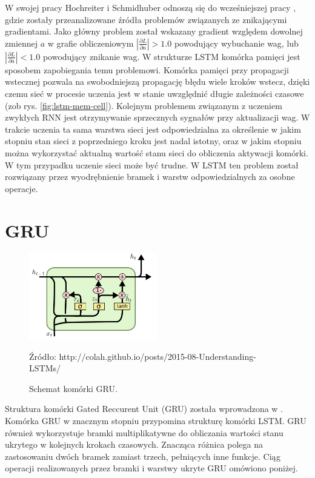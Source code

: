 \documentclass[oneside, mag]{mgr}
\begin{document}
W swojej pracy \cite{LSTM} Hochreiter i Schmidhuber odnoszą się do wcześniejszej pracy \cite{vanishing_gradient_RNN}, gdzie zostały przeanalizowane źródła problemów związanych ze znikającymi gradientami. Jako główny problem został wskazany gradient względem dowolnej zmiennej $a$ w grafie obliczeniowym $|\frac{\partial L}{\partial a}| > 1.0$ powodujący wybuchanie wag, lub $|\frac{\partial L}{\partial a}| < 1.0$ powodujący znikanie wag. W strukturze LSTM komórka pamięci jest sposobem zapobiegania temu problemowi. Komórka pamięci przy propagacji wstecznej pozwala na swobodniejszą propagację błędu wiele kroków wstecz, dzięki czemu sieć w procesie uczenia jest w stanie uwzględnić długie zależności czasowe (zob rys. \ref{fig:lstm-mem-cell}). Kolejnym problemem związanym z uczeniem zwykłych RNN jest otrzymywanie sprzecznych sygnałów przy aktualizacji wag. W trakcie uczenia ta sama warstwa sieci jest odpowiedzialna za określenie w jakim stopniu stan sieci z poprzedniego kroku jest nadal istotny, oraz w jakim stopniu można wykorzystać aktualną wartość stanu sieci do obliczenia aktywacji komórki. W tym przypadku uczenie sieci może być trudne. W LSTM ten problem został rozwiązany przez wyodrębnienie bramek i warstw odpowiedzialnych za osobne operacje.  

\section{GRU}

\begin{figure}
\centering
	\includegraphics[width=0.5\textwidth]{img/LSTM3-var-GRU.png}
	\caption{Schemat komórki GRU.} Źródło: http://colah.github.io/posts/2015-08-Understanding-LSTMs/
	\label{fig:gru}
\end{figure}

Struktura komórki Gated Reccurent Unit (GRU) została wprowadzona w \cite{DBLP:journals/corr/ChoMGBSB14}. Komórka GRU w znacznym stopniu przypomina strukturę komórki LSTM. GRU również wykorzystuje bramki multiplikatywne do obliczania wartości stanu ukrytego w kolejnych krokach czasowych. Znacząca różnica polega na zastosowaniu dwóch bramek zamiast trzech, pełniących inne funkcje. Ciąg operacji realizowanych przez bramki i warstwy ukryte GRU omówiono poniżej.
\end{document}
